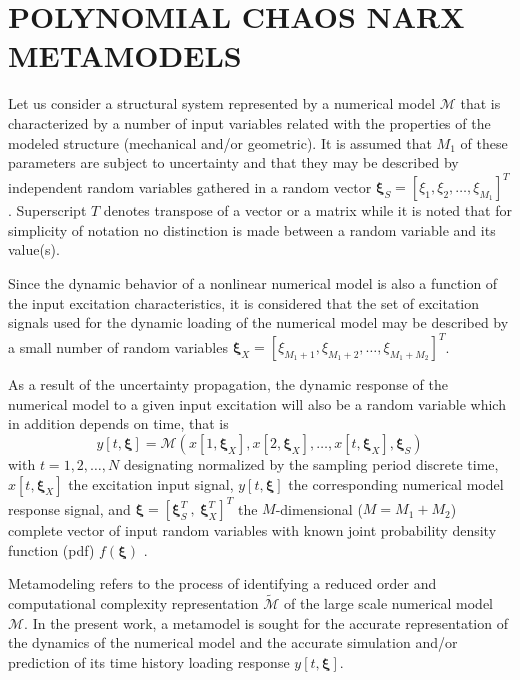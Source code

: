 \documentclass[preprint,3p,review,times,11pt]{elsarticle}
\newcommand{\beq}{\begin{equation}}
\newcommand{\eeq}{\end{equation}}
\newcommand{\bld}[1]{\boldsymbol{#1}}
\newcommand{\bxi}{\bld{\xi}}
\begin{document}
\section{POLYNOMIAL CHAOS NARX METAMODELS}
\label{sec:PCNARX}

Let us consider a structural system represented by a numerical model $\mathcal M$ that is characterized by a number of input variables related with the properties of the modeled structure (mechanical and/or geometric). It is assumed that $M_1$ of these parameters are subject to uncertainty and that they may be described by independent random variables gathered in a random vector $\bxi_S = [ \xi_{1}, \xi_{2},\ldots ,\xi_{M_1} ]^T$. Superscript $T$ denotes transpose of a vector or a matrix while it is noted that for simplicity of notation no distinction is made between a random variable and its value(s).

Since the dynamic behavior of a nonlinear numerical model is also a function of the input excitation characteristics, it is considered that the set of excitation signals used for the dynamic loading of the numerical model may be described by a small number of random variables $\bxi_X = [ \xi_{M_1+1}, \xi_{M_1+2},\ldots ,\xi_{M_1+M_2} ]^T$. 

As a result of the uncertainty propagation, the dynamic response of the numerical model to a given input excitation will also be a random variable which in addition depends on time, that is
\beq 
y[t,\bxi] = {\mathcal M}(x[1,\bxi_X],x[2,\bxi_X],\ldots,x[t,\bxi_X],\bxi_S)
\eeq
with $t = 1,2,\ldots, N $ designating normalized by the sampling period discrete time, $x[t,\bxi_X]$ the excitation input signal, $y[t,\bxi]$ the corresponding numerical model response signal, and $\bxi = [ \bxi_S^{T} \ ,\ \bxi_X^{T} ]^{T}$ the $M$-dimensional ($M = M_1 + M_2$) complete vector of input random variables with known joint probability density function (pdf) $f(\bxi)$ . 


Metamodeling refers to the process of identifying a reduced order and computational complexity representation $\widetilde{\mathcal M}$ of the large scale numerical model ${\mathcal M}$. In the present work, a metamodel is sought for the accurate representation of the dynamics of the numerical model and the accurate simulation and/or prediction of its time history loading response $y[t,\bxi]$. 
\end{document}
